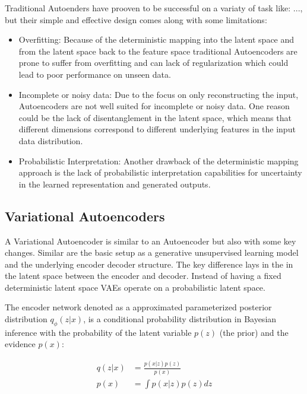 Traditional Autoenders have prooven to be successful on a variaty of task like: ..., but their simple and effective design comes along with some limitations:
\begin{itemize}
	\item Overfitting: Because of the deterministic mapping into the latent space and from the latent space back to the feature space traditional Autoencoders are prone to suffer from overfitting and can lack of regularization which could lead to poor performance on unseen data.
	\item Incomplete or noisy data: Due to the focus on only reconstructing the input, Autoencoders are not well suited for incomplete or noisy data. One reason could be the lack of disentanglement in the latent space, which means that different dimensions correspond to different underlying features in the input data distribution. 
	\item Probabilistic Interpretation: Another drawback of the deterministic mapping approach is the lack of probabilistic interpretation capabilities for uncertainty in the learned representation and generated outputs.  
\end{itemize}



\subsection{Variational Autoencoders}\label{sec:VAE}


A Variational Autoencoder is similar to an Autoencoder but also with some key changes. Similar are the basic setup as a generative unsupervised learning model and the underlying encoder decoder structure. The key difference lays in the in the latent space between the encoder and decoder. Instead of having a fixed deterministic latent space VAEs operate on a probabilistic latent space.



The encoder network denoted as a approximated parameterized posterior distribution $q_\phi(z|x)$, is a conditional probability distribution in Bayesian inference with the probability of the latent variable $p(z)$ (the prior) and the evidence $p(x)$: 

\begin{align}
	q(z|x) &= \frac{p(x|z) p(z)}{p(x)} \label{eqn:Bayesian-inference}\\
	p(x) &= \int p(x|z)p(z) dz \label{eqn:p(x)}
\end{align}

